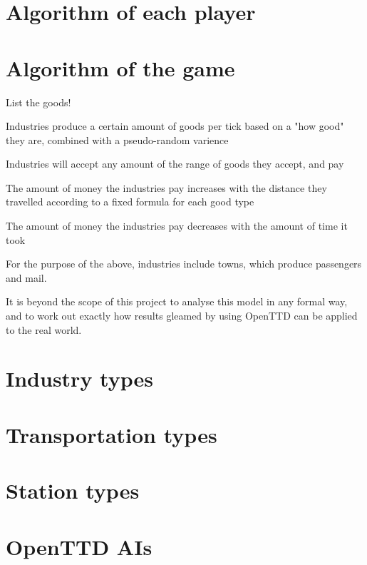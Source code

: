 \documentclass[logo,msc,dsti]{infthesis}    %
\begin{document}
\section{Algorithm of each player}

\section{Algorithm of the game}



List the goods!

\begin{itemize}
\begin{item}Industries produce a certain amount of goods per tick based on a "how good" they are, combined with a pseudo-random varience\end{item}
\begin{item}Industries will accept any amount of the range of goods they accept, and pay\end{item}
\begin{item}The amount of money the industries pay increases with the distance they travelled according to a fixed formula for each good type\end{item}
\begin{item}The amount of money the industries pay decreases with the amount of time it took\end{item}
\end{itemize}

For the purpose of the above, industries include towns, which produce passengers and mail.

It is beyond the scope of this project to analyse this model in any formal way, and to work out exactly how results gleamed by using OpenTTD can be applied to the real world.

\section{Industry types}

\section{Transportation types}

\section{Station types}

\section{OpenTTD AIs}
\end{document}
